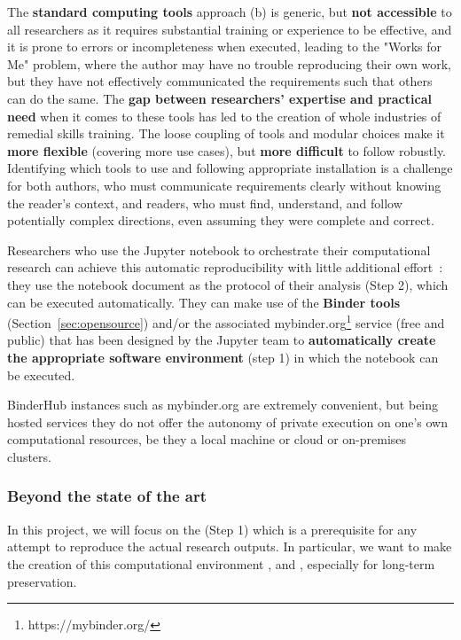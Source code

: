 The \textbf{standard computing tools} approach (b) is generic, but \textbf{not accessible} to all researchers
as it requires substantial training or experience to be effective,
and it is prone to errors or incompleteness when executed,
leading to the "Works for Me" problem,
where the author may have no trouble reproducing their own work,
but they have not effectively communicated the requirements such that others can do the same.
The \textbf{gap between researchers' expertise and practical need} when it comes to these tools has led to the creation
of whole industries of remedial skills training.
The loose coupling of tools and modular choices make it \textbf{more flexible} (covering more use cases),
but \textbf{more difficult} to follow robustly.
Identifying which tools to use and following appropriate installation is a challenge
for both authors, who must communicate requirements clearly without knowing the reader's context,
and readers, who must find, understand, and follow potentially complex directions, even assuming they were
complete and correct.

\medskip Researchers who use the Jupyter notebook to orchestrate their
computational research can achieve this automatic
reproducibility with little additional effort~\cite{Beg2021}: they use the notebook document as
the protocol of their analysis (Step 2), which can be executed automatically.
They can make use of the \textbf{Binder tools} (Section~\ref{sec:opensource}) and/or the
associated  mybinder.org\footnote{https://mybinder.org/} service (free and public) that has
been designed by the Jupyter team to \textbf{automatically create the appropriate
software environment} (step 1) in which the notebook can be executed.

BinderHub instances such as mybinder.org are extremely convenient,
but being hosted services they do not offer the autonomy
of private execution on one's own computational resources,
be they a local machine or cloud or on-premises clusters.

\subsubsection{Beyond the state of the art}

In this project, we will focus on the  (Step 1) which is a prerequisite for any attempt to
reproduce the actual research outputs. In particular, we want to make the
creation of this computational environment ,  and ,
especially for long-term preservation.

